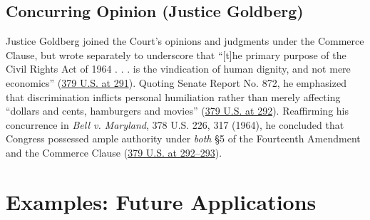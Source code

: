 \documentclass[12pt]{article}
\begin{document}
\subsection{Concurring Opinion (Justice Goldberg)}

Justice Goldberg joined the Court's opinions and judgments under the Commerce Clause, but wrote separately to underscore that ``[t]he primary purpose of the Civil Rights Act of 1964 . . . is the vindication of human dignity, and not mere economics'' (\href{https://supreme.justia.com/cases/federal/us/379/241/}{379 U.S. at 291}). Quoting Senate Report No. 872, he emphasized that discrimination inflicts personal humiliation rather than merely affecting ``dollars and cents, hamburgers and movies'' (\href{https://supreme.justia.com/cases/federal/us/379/241/}{379 U.S. at 292}). Reaffirming his concurrence in \textit{Bell v. Maryland}, 378 U.S. 226, 317 (1964), he concluded that Congress possessed ample authority under \textit{both} \S 5 of the Fourteenth Amendment and the Commerce Clause (\href{https://supreme.justia.com/cases/federal/us/379/241/}{379 U.S. at 292--293}).

\section{Examples: Future Applications}
\end{document}

